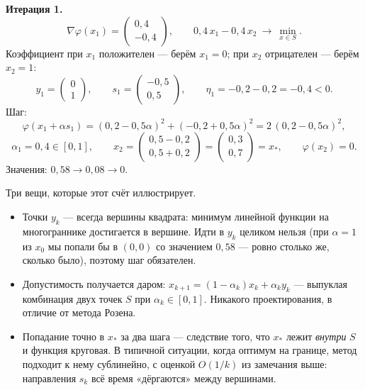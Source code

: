 \begin{example}
\medskip
\noindent\textbf{Итерация 1.}
\[
  \nabla\varphi(x_1) = \begin{pmatrix} 0{,}4 \\ -0{,}4 \end{pmatrix} ,
  \qquad
  0{,}4\,x_1 - 0{,}4\,x_2 \ \longrightarrow\ \min_{x \in S} .
\]
Коэффициент при $x_1$ положителен — берём $x_1 = 0$; при $x_2$ отрицателен —
берём $x_2 = 1$:
\[
  y_1 = \begin{pmatrix} 0 \\ 1 \end{pmatrix} ,
  \qquad
  s_1 = \begin{pmatrix} -0{,}5 \\ 0{,}5 \end{pmatrix} ,
  \qquad
  \eta_1 = -0{,}2 - 0{,}2 = -0{,}4 < 0 .
\]
Шаг:
\[
  \varphi(x_1 + \alpha s_1)
   = (0{,}2 - 0{,}5\alpha)^2 + (-0{,}2 + 0{,}5\alpha)^2
   = 2\,(0{,}2 - 0{,}5\alpha)^2 ,
\]
\[
  \alpha_1 = 0{,}4 \in [0,1] ,
  \qquad
  x_2 = \begin{pmatrix} 0{,}5 - 0{,}2 \\ 0{,}5 + 0{,}2 \end{pmatrix}
      = \begin{pmatrix} 0{,}3 \\ 0{,}7 \end{pmatrix} = x_* ,
  \qquad \varphi(x_2) = 0 .
\]
Значения: $0{,}58 \to 0{,}08 \to 0$.
\end{example}

\begin{idea}
Три вещи, которые этот счёт иллюстрирует.

\begin{itemize}[nosep,left=0pt]
  \item Точки $y_k$ — всегда вершины квадрата: минимум линейной функции на
        многограннике достигается в вершине. Идти в $y_k$ целиком нельзя
        (при $\alpha = 1$ из $x_0$ мы попали бы в $(0,0)$ со значением
        $0{,}58$ — ровно столько же, сколько было), поэтому шаг обязателен.
  \item Допустимость получается даром: $x_{k+1} = (1-\alpha_k)x_k + \alpha_k y_k$
        — выпуклая комбинация двух точек $S$ при $\alpha_k \in [0,1]$. Никакого
        проектирования, в отличие от метода Розена.
  \item Попадание точно в $x_*$ за два шага — следствие того, что $x_*$ лежит
        \emph{внутри} $S$ и функция круговая. В типичной ситуации, когда
        оптимум на границе, метод подходит к нему сублинейно, с оценкой
        $O(1/k)$ из замечания выше: направления $s_k$ всё время «дёргаются»
        между вершинами.
\end{itemize}
\end{idea}
